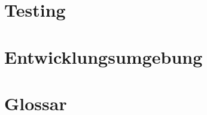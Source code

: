 \documentclass{article}
\begin{document}
\newpage

\section{Testing}

\newpage

\section{Entwicklungsumgebung}

\newpage

\section{Glossar}
\end{document}
